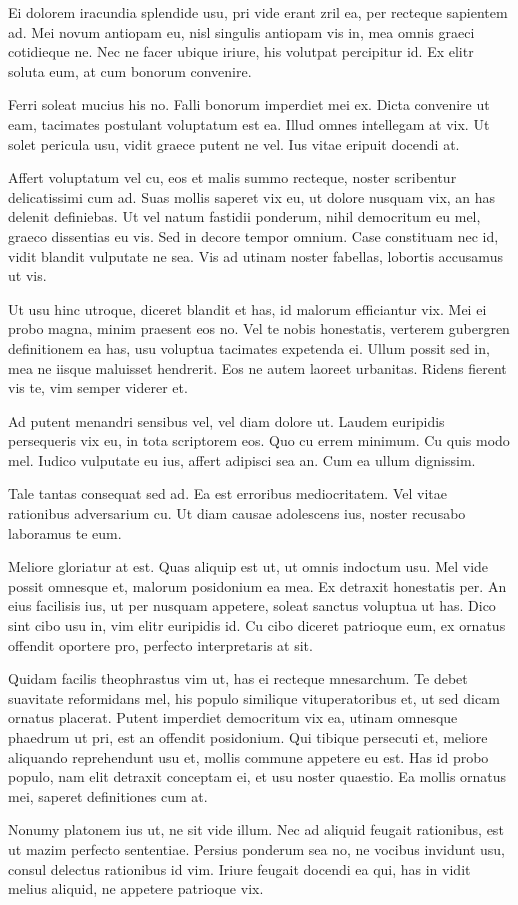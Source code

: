 \documentclass[11pt,a4paper]{article}
\begin{document}
    
    Ei dolorem iracundia splendide usu, pri vide erant zril ea, per recteque sapientem ad. Mei novum antiopam eu, nisl singulis antiopam vis in, mea omnis graeci cotidieque ne. Nec ne facer ubique iriure, his volutpat percipitur id. Ex elitr soluta eum, at cum bonorum convenire.
    
    Ferri soleat mucius his no. Falli bonorum imperdiet mei ex. Dicta convenire ut eam, tacimates postulant voluptatum est ea. Illud omnes intellegam at vix. Ut solet pericula usu, vidit graece putent ne vel. Ius vitae eripuit docendi at.
    
    Affert voluptatum vel cu, eos et malis summo recteque, noster scribentur delicatissimi cum ad. Suas mollis saperet vix eu, ut dolore nusquam vix, an has delenit definiebas. Ut vel natum fastidii ponderum, nihil democritum eu mel, graeco dissentias eu vis. Sed in decore tempor omnium. Case constituam nec id, vidit blandit vulputate ne sea. Vis ad utinam noster fabellas, lobortis accusamus ut vis.
    
    Ut usu hinc utroque, diceret blandit et has, id malorum efficiantur vix. Mei ei probo magna, minim praesent eos no. Vel te nobis honestatis, verterem gubergren definitionem ea has, usu voluptua tacimates expetenda ei. Ullum possit sed in, mea ne iisque maluisset hendrerit. Eos ne autem laoreet urbanitas. Ridens fierent vis te, vim semper viderer et.
   
    \begin{multicols}{2}
    Ad putent menandri sensibus vel, vel diam dolore ut. Laudem euripidis persequeris vix eu, in tota scriptorem eos. Quo cu errem minimum. Cu quis modo mel. Iudico vulputate eu ius, affert adipisci sea an. Cum ea ullum dignissim.
    
    Tale tantas consequat sed ad. Ea est erroribus mediocritatem. Vel vitae rationibus adversarium cu. Ut diam causae adolescens ius, noster recusabo laboramus te eum.
    
    Meliore gloriatur at est. Quas aliquip est ut, ut omnis indoctum usu. Mel vide possit omnesque et, malorum posidonium ea mea. Ex detraxit honestatis per. An eius facilisis ius, ut per nusquam appetere, soleat sanctus voluptua ut has. Dico sint cibo usu in, vim elitr euripidis id. Cu cibo diceret patrioque eum, ex ornatus offendit oportere pro, perfecto interpretaris at sit.
    
    \end{multicols}
    
    Quidam facilis theophrastus vim ut, has ei recteque mnesarchum. Te debet suavitate reformidans mel, his populo similique vituperatoribus et, ut sed dicam ornatus placerat. Putent imperdiet democritum vix ea, utinam omnesque phaedrum ut pri, est an offendit posidonium. Qui tibique persecuti et, meliore aliquando reprehendunt usu et, mollis commune appetere eu est. Has id probo populo, nam elit detraxit conceptam ei, et usu noster quaestio. Ea mollis ornatus mei, saperet definitiones cum at.
    
    Nonumy platonem ius ut, ne sit vide illum. Nec ad aliquid feugait rationibus, est ut mazim perfecto sententiae. Persius ponderum sea no, ne vocibus invidunt usu, consul delectus rationibus id vim. Iriure feugait docendi ea qui, has in vidit melius aliquid, ne appetere patrioque vix.
\end{document}
